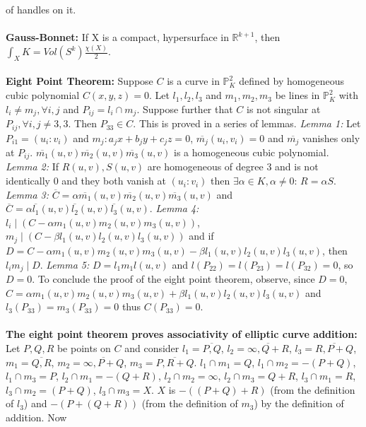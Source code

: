 of handles on it. 
\\
\\
{\bf Gauss-Bonnet:}  If X is a compact, hypersurface in ${\mathbb R}^{k+1}$, then
$\int_X K = Vol( S^k ){\frac {\chi (X)} {2}}$.
\\
\\
{\bf Eight Point Theorem:}
Suppose $C$ is a curve in ${\mathbb P}^2_K$ defined by 
homogeneous cubic polynomial $C(x,y,z)=0$.
Let $l_1, l_2, l_3$ and $m_1, m_2, m_3$ be lines in ${\mathbb P}^2_K$ with 
$l_i \ne m_j, \forall i,j$ and $P_{ij}= l_i \cap m_j$.  Suppose further that $C$ is not
singular at $P_{ij}, \forall i,j \ne 3,3$.  Then $P_{33} \in C$.
This is proved in a series of lemmas. \emph{Lemma 1:} Let $P_{i1}=(u_i : v_i)$ 
and $m_j : a_j x +b_j y +c_j z=0$, 
${\overline {m_j}} (u_i, v_i) = 0$ and
${\overline {m_j}}$ vanishes only at $P_{ij}$.
${\overline {m_1}} (u,v) {\overline {m_2}} (u,v) {\overline {m_3}} (u,v)$
is a homogeneous cubic polynomial.   
\emph{Lemma 2:} If $R(u,v), S(u,v)$ are homogeneous of
degree $3$ and is not identically $0$ and they both vanish at $(u_i:v_i)$ then 
$\exists  \alpha \in K, \alpha \ne 0$: $R = \alpha S$.  
\emph{Lemma 3:}
${\overline C}= \alpha {\overline {m_1}} (u,v) {\overline {m_2}} (u,v) {\overline {m_3}} (u,v)$
and
${\overline C}= \alpha {\overline {l_1}} (u,v) {\overline {l_2}} (u,v) {\overline {l_3}} (u,v)$.
\emph{Lemma 4:}  $l_i \mid (C - \alpha m_1 (u,v) m_2 (u,v) m_3 (u,v))$,
$m_j \mid (C - \beta l_1(u,v) l_2 (u,v) l_3 (u,v))$ and
if $D= C - \alpha m_1 (u,v) m_2 (u,v) m_3 (u,v) - \beta l_1 (u,v) l_2 (u,v) l_3 (u,v)$, then
$l_i m_ j \mid D$.  
\emph{Lemma 5:} $D = l_1 m_1 l(u,v)$ and
$l(P_{22})= l(P_{23})= l(P_{32})=0$, so $D=0$.  To conclude the proof of the
eight point theorem, observe, since $D=0$, 
$C= \alpha m_1 (u,v) m_2 (u,v) m_3 (u,v) + \beta l_1 (u,v) l_2 (u,v) l_3 (u,v)$ and
$l_3 (P_{33})= m_3 (P_{33}) =0$ thus $C (P_{33})=0$.
\\
\\
{\bf The eight point theorem proves associativity of elliptic curve addition:}
Let $P, Q, R$ be points
on $C$ and consider
$l_1= {\overline {P,Q}}$,
$l_2= {\overline {\infty,Q+R}}$,
$l_3= {\overline {R,P+Q}}$,
$m_1= {\overline {Q,R}}$,
$m_2= {\overline {\infty,P+Q}}$,
$m_3= {\overline {P,R+Q}}$.
$l_1 \cap m_1= Q$,
$l_1 \cap m_2= -(P+Q)$,
$l_1 \cap m_3= P$,
$l_2 \cap m_1= -(Q+R)$,
$l_2 \cap m_2= \infty$,
$l_2 \cap m_3= Q+R$,
$l_3 \cap m_1= R$,
$l_3 \cap m_2= (P+Q)$,
$l_3 \cap m_3= X$. $X$ is $-((P+Q)+R)$ (from the definition of $l_3$) and $-(P+(Q+R))$ 
(from the definition of $m_3$) by the definition of addition.  Now
